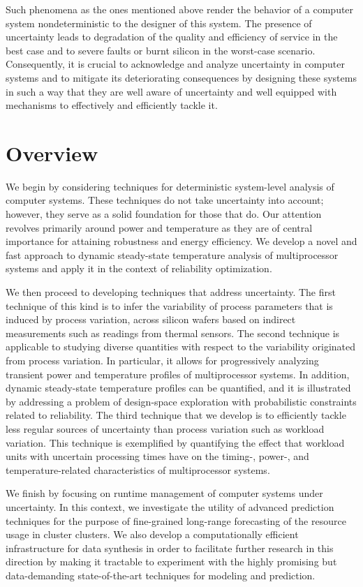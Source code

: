 Such phenomena as the ones mentioned above render the behavior of a computer
system nondeterministic to the designer of this system. The presence of
uncertainty leads to degradation of the quality and efficiency of service in the
best case and to severe faults or burnt silicon in the worst-case scenario.
Consequently, it is crucial to acknowledge and analyze uncertainty in computer
systems and to mitigate its deteriorating consequences by designing these
systems in such a way that they are well aware of uncertainty and well equipped
with mechanisms to effectively and efficiently tackle it.

\section{Overview}

We begin by considering techniques for deterministic system-level analysis of
computer systems. These techniques do not take uncertainty into account;
however, they serve as a solid foundation for those that do. Our attention
revolves primarily around power and temperature as they are of central
importance for attaining robustness and energy efficiency. We develop a novel
and fast approach to dynamic steady-state temperature analysis of multiprocessor
systems and apply it in the context of reliability optimization.

We then proceed to developing techniques that address uncertainty. The first
technique of this kind is to infer the variability of process parameters that is
induced by process variation, across silicon wafers based on indirect
measurements such as readings from thermal sensors. The second technique is
applicable to studying diverse quantities with respect to the variability
originated from process variation. In particular, it allows for progressively
analyzing transient power and temperature profiles of multiprocessor systems. In
addition, dynamic steady-state temperature profiles can be quantified, and it is
illustrated by addressing a problem of design-space exploration with
probabilistic constraints related to reliability. The third technique that we
develop is to efficiently tackle less regular sources of uncertainty than
process variation such as workload variation. This technique is exemplified by
quantifying the effect that workload units with uncertain processing times have
on the timing-, power-, and temperature-related characteristics of
multiprocessor systems.

We finish by focusing on runtime management of computer systems under
uncertainty. In this context, we investigate the utility of advanced prediction
techniques for the purpose of fine-grained long-range forecasting of the
resource usage in cluster clusters. We also develop a computationally efficient
infrastructure for data synthesis in order to facilitate further research in
this direction by making it tractable to experiment with the highly promising
but data-demanding state-of-the-art techniques for modeling and prediction.

